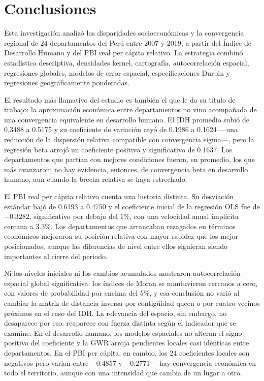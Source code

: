 \section{Conclusiones}

Esta investigación analizó las disparidades socioeconómicas y la
convergencia regional de 24 departamentos del Perú entre 2007 y 2019, a
partir del Índice de Desarrollo Humano y del PBI real per cápita relativo.
La estrategia combinó estadística descriptiva, densidades kernel,
cartografía, autocorrelación espacial, regresiones globales, modelos de
error espacial, especificaciones Durbin y regresiones geográficamente
ponderadas.
 
El resultado más llamativo del estudio es también el que le da su título de
trabajo: la aproximación económica entre departamentos no vino acompañada de
una convergencia equivalente en desarrollo humano. El IDH promedio subió de
0.3488 a 0.5175 y su coeficiente de variación cayó de 0.1986 a 0.1624 —una
reducción de la dispersión relativa compatible con convergencia sigma—, pero
la regresión beta arrojó un coeficiente positivo y significativo de 0.1637.
Los departamentos que partían con mejores condiciones fueron, en promedio,
los que más avanzaron; no hay evidencia, entonces, de convergencia beta en
desarrollo humano, aun cuando la brecha relativa se haya estrechado.
 
El PBI real per cápita relativo cuenta una historia distinta. Su desviación
estándar bajó de 0.6193 a 0.4750 y el coeficiente inicial de la regresión
OLS fue de $-0.3282$, significativo por debajo del 1\%, con una velocidad
anual implícita cercana a 3.3\%. Los departamentos que arrancaban rezagados
en términos económicos mejoraron su posición relativa con mayor rapidez que
los mejor posicionados, aunque las diferencias de nivel entre ellos
siguieran siendo importantes al cierre del periodo.
 
Ni los niveles iniciales ni los cambios acumulados mostraron autocorrelación
espacial global significativa: los índices de Moran se mantuvieron cercanos
a cero, con valores de probabilidad por encima del 5\%, y esa conclusión no
varió al cambiar la matriz de distancia inversa por contigüidad queen o por
cuatro vecinos próximos en el caso del IDH. La relevancia del espacio, sin
embargo, no desaparece por eso: reaparece con fuerza distinta según el
indicador que se examine. En el desarrollo humano, los modelos espaciales no
alteran el signo positivo del coeficiente y la GWR arroja pendientes locales
casi idénticas entre departamentos. En el PBI per cápita, en cambio, los 24
coeficientes locales son negativos pero varían entre $-0.4857$ y $-0.2771$
—hay convergencia económica en todo el territorio, aunque con una intensidad
que cambia de un lugar a otro.
 
